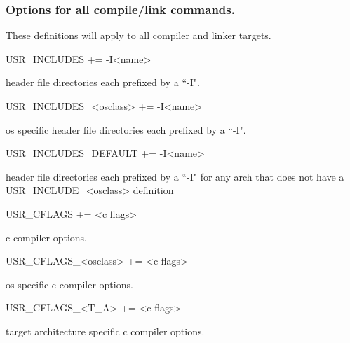 \subsubsection{Options for all compile/link commands.}

These definitions will apply to all compiler and linker targets.

\begin{description}\item {}USR\_INCLUDES += -I\textless{}name\textgreater{}

\end{description}header file directories each prefixed by a ``-I".

\begin{description}\item USR\_INCLUDES\_\textless{}osclass\textgreater{} += -I\textless{}name\textgreater{}

\end{description}os specific header file directories each prefixed by a ``-I".

\begin{description}\item USR\_INCLUDES\_DEFAULT += -I\textless{}name\textgreater{}

\end{description}header file directories each prefixed by a ``-I" for any arch that does not have a USR\_INCLUDE\_\textless{}osclass\textgreater{} 
definition

\begin{description}\item {}USR\_CFLAGS += \textless{}c flags\textgreater{}

\end{description}c compiler options.

\begin{description}\item USR\_CFLAGS\_\textless{}osclass\textgreater{} += \textless{}c flags\textgreater{}

\end{description}os specific c compiler options.

\begin{description}\item USR\_CFLAGS\_\textless{}T\_A\textgreater{} += \textless{}c flags\textgreater{}

\end{description}target architecture specific c compiler options.

